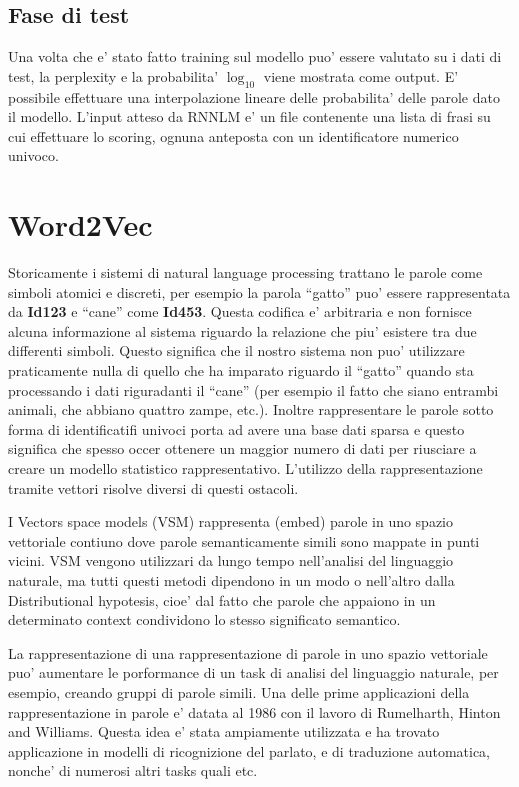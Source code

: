\documentclass[a4paper,11pt]{book}
\theoremstyle{definition}
\begin{document}
\subsection{Fase di test}
Una volta che e' stato fatto training sul modello puo' essere valutato su i dati di test, la perplexity e la 
probabilita' $\log_{10}$ viene mostrata come output.
E' possibile effettuare una interpolazione lineare delle probabilita' delle parole dato il modello. L'input atteso
da RNNLM e' un file contenente una lista di frasi su cui effettuare lo scoring, ognuna anteposta con un identificatore
numerico univoco.
\section{Word2Vec}
Storicamente i sistemi di natural language processing trattano le parole come simboli atomici e discreti,
per esempio la parola ``gatto'' puo' essere rappresentata da \textbf{Id123} e ``cane'' come \textbf{Id453}.
Questa codifica e' arbitraria e non fornisce alcuna informazione al sistema riguardo la relazione
che piu' esistere tra due differenti simboli.
Questo significa che il nostro sistema non puo' utilizzare praticamente nulla di quello che ha imparato
riguardo il ``gatto'' quando sta processando i dati riguradanti il ``cane'' (per esempio il fatto che siano
entrambi animali, che abbiano quattro zampe, etc.).
Inoltre rappresentare le parole sotto forma di identificatifi univoci porta ad avere una base dati sparsa
e questo significa che spesso occer ottenere un maggior numero di dati per riusciare a creare un modello
statistico rappresentativo.
L'utilizzo della rappresentazione tramite vettori risolve diversi di questi ostacoli.

I Vectors space models (VSM) rappresenta (embed) parole in uno spazio vettoriale contiuno dove parole
semanticamente simili sono mappate in punti vicini.
VSM vengono utilizzari da lungo tempo nell'analisi del linguaggio naturale, ma tutti questi metodi dipendono
in un modo o nell'altro dalla Distributional hypotesis, cioe' dal fatto che parole che appaiono in 
un determinato context condividono lo stesso significato semantico.

La rappresentazione di una rappresentazione di parole in uno spazio vettoriale puo' aumentare le porformance
di un task di analisi del linguaggio naturale, per esempio, creando gruppi di parole simili. Una delle prime
applicazioni della rappresentazione in parole e' datata al 1986 con il lavoro di Rumelharth, Hinton and Williams.
Questa idea e' stata ampiamente utilizzata e ha trovato applicazione in modelli di ricognizione del parlato,
e di traduzione automatica, nonche' di numerosi altri tasks quali etc.
\end{document}
